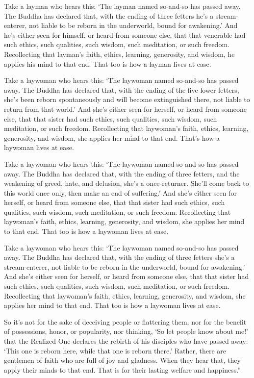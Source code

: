 \documentclass[12pt,openany]{book}%
\begin{document}
Take a layman who hears this: ‘The layman named so-and-so has passed away. The Buddha has declared that, with the ending of three fetters he’s a stream-enterer, not liable to be reborn in the underworld, bound for awakening.’ And he’s either seen for himself, or heard from someone else, that that venerable had such ethics, such qualities, such wisdom, such meditation, or such freedom. Recollecting that layman’s faith, ethics, learning, generosity, and wisdom, he applies his mind to that end. That too is how a layman lives at ease. 

Take a laywoman who hears this: ‘The laywoman named so-and-so has passed away. The Buddha has declared that, with the ending of the five lower fetters, she’s been reborn spontaneously and will become extinguished there, not liable to return from that world.’ And she’s either seen for herself, or heard from someone else, that that sister had such ethics, such qualities, such wisdom, such meditation, or such freedom. Recollecting that laywoman’s faith, ethics, learning, generosity, and wisdom, she applies her mind to that end. That’s how a laywoman lives at ease. 

Take a laywoman who hears this: ‘The laywoman named so-and-so has passed away. The Buddha has declared that, with the ending of three fetters, and the weakening of greed, hate, and delusion, she’s a once-returner. She’ll come back to this world once only, then make an end of suffering.’ And she’s either seen for herself, or heard from someone else, that that sister had such ethics, such qualities, such wisdom, such meditation, or such freedom. Recollecting that laywoman’s faith, ethics, learning, generosity, and wisdom, she applies her mind to that end. That too is how a laywoman lives at ease. 

Take a laywoman who hears this: ‘The laywoman named so-and-so has passed away. The Buddha has declared that, with the ending of three fetters she’s a stream-enterer, not liable to be reborn in the underworld, bound for awakening.’ And she’s either seen for herself, or heard from someone else, that that sister had such ethics, such qualities, such wisdom, such meditation, or such freedom. Recollecting that laywoman’s faith, ethics, learning, generosity, and wisdom, she applies her mind to that end. That too is how a laywoman lives at ease. 

So it’s not for the sake of deceiving people or flattering them, nor for the benefit of possessions, honor, or popularity, nor thinking, ‘So let people know about me!’ that the Realized One declares the rebirth of his disciples who have passed away: ‘This one is reborn here, while that one is reborn there.’ Rather, there are gentlemen of faith who are full of joy and gladness. When they hear that, they apply their minds to that end. That is for their lasting welfare and happiness.” 
\end{document}
